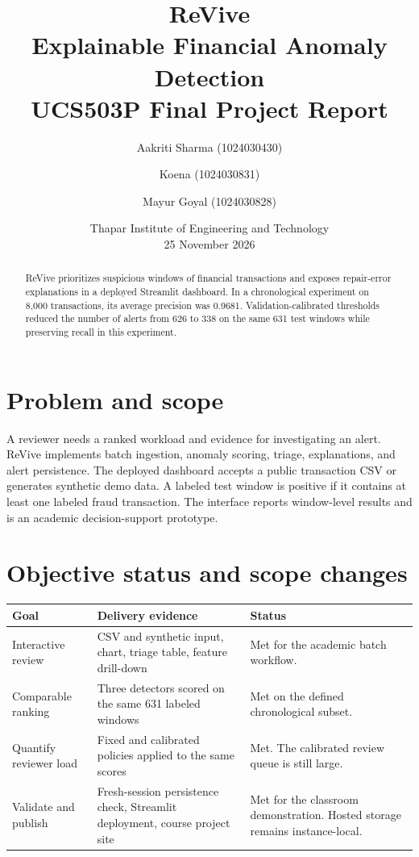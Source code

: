 \documentclass[11pt,a4paper]{article}
\title{ReVive\\\large Explainable Financial Anomaly Detection\\UCS503P Final Project Report}
\author{Aakriti Sharma (1024030430) \and Koena (1024030831) \and Mayur Goyal (1024030828)}
\date{Thapar Institute of Engineering and Technology\\25 November 2026}
\begin{document}
\renewcommand{\labelitemi}{\(\bullet\)}
\maketitle
\begin{abstract}
ReVive prioritizes suspicious windows of financial transactions and exposes repair-error explanations in a deployed Streamlit dashboard. In a chronological experiment on 8,000 transactions, its average precision was 0.9681. Validation-calibrated thresholds reduced the number of alerts from 626 to 338 on the same 631 test windows while preserving recall in this experiment.
\end{abstract}

\section{Problem and scope}
A reviewer needs a ranked workload and evidence for investigating an alert. ReVive implements batch ingestion, anomaly scoring, triage, explanations, and alert persistence. The deployed dashboard accepts a public transaction CSV or generates synthetic demo data. A labeled test window is positive if it contains at least one labeled fraud transaction. The interface reports window-level results and is an academic decision-support prototype.

\section{Objective status and scope changes}
\begin{tabularx}{\linewidth}{@{}lXX@{}}
\toprule
Goal & Delivery evidence & Status\\
\midrule
Interactive review & CSV and synthetic input, chart, triage table, feature drill-down & Met for the academic batch workflow.\\
Comparable ranking & Three detectors scored on the same 631 labeled windows & Met on the defined chronological subset.\\
Quantify reviewer load & Fixed and calibrated policies applied to the same scores & Met. The calibrated review queue is still large.\\
Validate and publish & Fresh-session persistence check, Streamlit deployment, course project site & Met for the classroom demonstration. Hosted storage remains instance-local.\\
\bottomrule
\end{tabularx}
\end{document}
